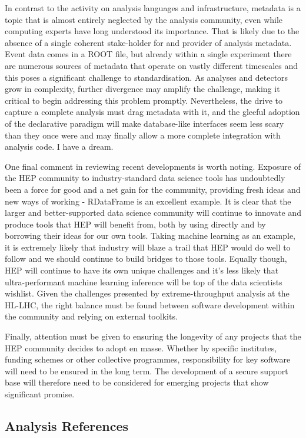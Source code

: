 \documentclass[10pt,a4paper]{article}
\begin{document}
In contrast to the activity on analysis languages and infrastructure,
metadata is a topic that is almost entirely neglected by the analysis
community, even while computing experts have long understood its
importance. That is likely due to the absence of a single coherent
stake-holder for and provider of analysis metadata. Event data comes in
a ROOT file, but already within a single experiment there are numerous
sources of metadata that operate on vastly different timescales and this
poses a significant challenge to standardisation. As analyses and
detectors grow in complexity, further divergence may amplify the
challenge, making it critical to begin addressing this problem promptly.
Nevertheless, the drive to capture a complete analysis must drag
metadata with it, and the gleeful adoption of the declarative paradigm
will make database-like interfaces seem less scary than they once were
and may finally allow a more complete integration with analysis code. I
have a dream.

One final comment in reviewing recent developments is worth noting.
Exposure of the HEP community to industry-standard data science tools
has undoubtedly been a force for good and a net gain for the community,
providing fresh ideas and new ways of working - RDataFrame is an
excellent example. It is clear that the larger and better-supported data
science community will continue to innovate and produce tools that HEP
will benefit from, both by using directly and by borrowing their ideas
for our own tools. Taking machine learning as an example, it is
extremely likely that industry will blaze a trail that HEP would do well
to follow and we should continue to build bridges to those tools.
Equally though, HEP will continue to have its own unique challenges and
it's less likely that ultra-performant machine learning inference will
be top of the data scientists wishlist. Given the challenges presented
by extreme-throughput analysis at the HL-LHC, the right balance must be
found between software development within the community and relying on
external toolkits.

Finally, attention must be given to ensuring the longevity of any
projects that the HEP community decides to adopt en masse. Whether by
specific institutes, funding schemes or other collective programmes,
responsibility for key software will need to be ensured in the long
term. The development of a secure support base will therefore need to be
considered for emerging projects that show significant promise.

\subsection{Analysis References}\label{references-2}
\end{document}
